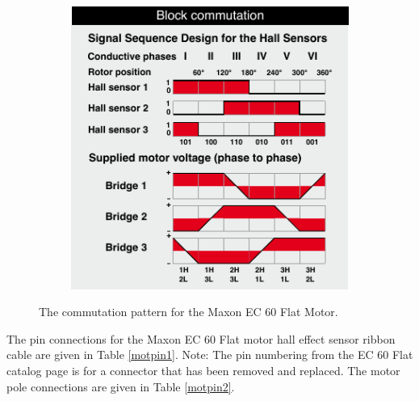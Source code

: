 \documentclass{article}
\begin{document}
\begin{figure}[h!]
\begin{subfigure}{0.4\textwidth}
		\includegraphics[width=\textwidth]{commutation2}
		\caption{}
	\end{subfigure}
	\caption{The commutation pattern for the Maxon EC 60 Flat Motor.\protect\footnotemark}
	\label{fig:commutation}
\end{figure}

The pin connections for the Maxon EC 60 Flat motor hall effect sensor ribbon cable  are given in Table \ref{motpin1}. Note: The pin numbering from the EC 60 Flat catalog page is for a connector that has been removed and replaced. The motor pole connections are given in Table \ref{motpin2}.
\end{document}
